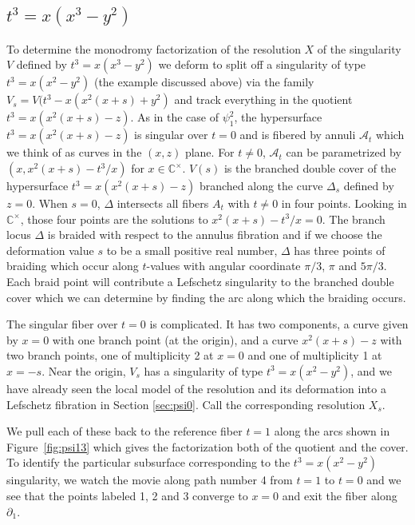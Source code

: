 \documentclass[11pt,letterpaper,reqno]{amsart}
\theoremstyle{remark}
\newcommand{\CC}{{\mathbb C}}
\def \A {\mathcal{A}}
\begin{document}
\subsection{\texorpdfstring{{\boldmath $t^3= x(x^3-y^2)$}}{psi3}}
\label{sec:psi3}
To determine the monodromy factorization of the resolution $X$ of the singularity $V$ defined by $t^3 = x(x^3-y^2)$ we deform to split off a singularity of type $t^3 = x(x^2 - y^2)$ (the example discussed above) via the family $V_s = V(t^3 - x(x^2(x+s) + y^2)$ and track everything in the quotient $t^3 = x(x^2(x+s) -z)$. As in the case of $\psi_1^2$, the hypersurface $t^3 = x(x^2(x+s) -z)$ is singular over $t=0$ and is fibered by annuli $\A_t$ which we think of as curves in the $(x,z)$ plane. For $t\neq 0$, $\A_t$ can be parametrized by $(x,x^2(x+s) -t^3/x)$ for $x \in \CC^\times$. $V(s)$ is the branched double cover of the hypersurface $t^3 = x(x^2(x+s) -z)$ branched along the curve $\Delta_s$ defined by $z=0$. When $s=0$, $\Delta$ intersects all fibers $A_t$ with $t\neq 0$ in four points. Looking in $\CC^\times$, those four points are the solutions to $x^2(x+s) - t^3/x = 0$. The branch locus $\Delta$ is braided with respect to the annulus fibration and if we choose the deformation value $s$ to be a small positive real number, $\Delta$ has three points of braiding which occur along $t$-values with angular coordinate $\pi/3$, $\pi$ and $5\pi/3$. Each braid point  will contribute a Lefschetz singularity to the branched double cover which we can determine by finding the arc along which the braiding occurs.

The singular fiber over $t=0$ is complicated. It has two components, a curve given by $x=0$ with one branch point (at the origin), and a curve $x^2(x+s) -z$ with two branch points, one of multiplicity 2 at $x=0$ and one of multiplicity 1 at $x = -s$. Near the origin, $V_s$ has a singularity of type $t^3 = x(x^2 - y^2)$, and we have already seen the local model of the resolution and its deformation into a Lefschetz fibration in Section \ref{sec:psi0}. Call the corresponding resolution $X_s$. 

We pull each of these back to the reference fiber $t=1$ along the arcs shown in Figure~\ref{fig:psi13} which gives the factorization both of the quotient and the cover. To identify the particular subsurface corresponding to the $t^3 = x(x^2 - y^2)$ singularity, we watch the movie along path number 4 from $t=1$ to $t=0$ and we see that the points labeled 1, 2 and 3 converge to $x=0$ and exit the fiber along $\partial_1$. 
\end{document}
